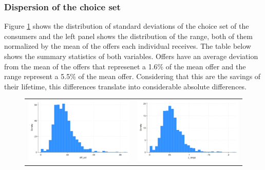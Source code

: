 \documentclass[12pt]{article}
\begin{document}
\subsubsection{Dispersion of the choice set}
Figure \ref{fig:ie2_5} shows the distribution of standard deviations of the choice set of the consumers and the left panel shows the distribution of the range, both of them normalized by the mean of the offers each individual receives.  The table below shows the summary statistics of both variables. Offers have an average deviation from the mean of the offers that represenet a 1.6\% of the mean offer and the range represent a 5.5\% of the mean offer. Considering that this are the savings of their lifetime, this differences translate into considerable absolute differences.
\begin{figure}[H] 
\caption{}
\label{fig:ie2_5}
\centering{}%
\begin{tabular}{cc}
\includegraphics[scale=0.26]{figures/IE2_dispertion_choice_set.png} & \includegraphics[scale=0.26]{figures/IE2_dispertion_choice_set_range.png}
\end{tabular}
\end{figure}
\end{document}
